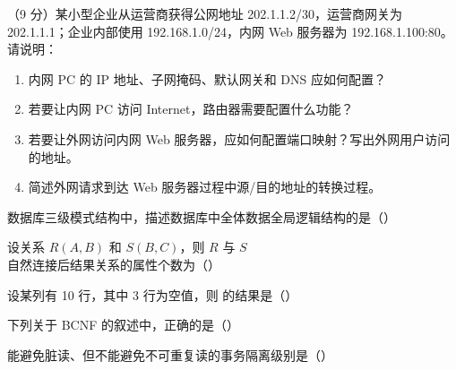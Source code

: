 \documentclass[a4paper,11pt]{article}
\begin{document}
\q （9 分）某小型企业从运营商获得公网地址 202.1.1.2/30，运营商网关为 202.1.1.1；企业内部使用 192.168.1.0/24，内网 Web 服务器为 192.168.1.100:80。请说明：
\begin{enumerate}[label=（\arabic*）, leftmargin=2.4em, itemsep=1pt]
  \item 内网 PC 的 IP 地址、子网掩码、默认网关和 DNS 应如何配置？
  \item 若要让内网 PC 访问 Internet，路由器需要配置什么功能？
  \item 若要让外网访问内网 Web 服务器，应如何配置端口映射？写出外网用户访问的地址。
  \item 简述外网请求到达 Web 服务器过程中源/目的地址的转换过程。
\end{enumerate}
\anslines{8cm}



\q 数据库三级模式结构中，描述数据库中全体数据全局逻辑结构的是（\quad）

\q 设关系 $R(A,B)$ 和 $S(B,C)$，则 $R$ 与 $S$ 自然连接后结果关系的属性个数为（\quad）

\q 设某列有 10 行，其中 3 行为空值，则  的结果是（\quad）

\q 下列关于 BCNF 的叙述中，正确的是（\quad）

\q 能避免脏读、但不能避免不可重复读的事务隔离级别是（\quad）

\end{document}
